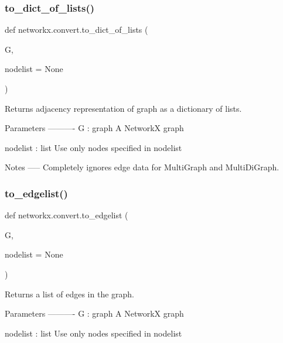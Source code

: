  \mbox{\label{namespacenetworkx_1_1convert_ac0bae8a707df0fe064309f8d481b695f}} 
\subsubsection{\texorpdfstring{to\+\_\+dict\+\_\+of\+\_\+lists()}{to\_dict\_of\_lists()}}
{\footnotesize\ttfamily def networkx.\+convert.\+to\+\_\+dict\+\_\+of\+\_\+lists (\begin{DoxyParamCaption}\item[{}]{G,  }\item[{}]{nodelist = {\ttfamily None} }\end{DoxyParamCaption})}

\begin{DoxyVerb}Returns adjacency representation of graph as a dictionary of lists.

Parameters
----------
G : graph
   A NetworkX graph

nodelist : list
   Use only nodes specified in nodelist

Notes
-----
Completely ignores edge data for MultiGraph and MultiDiGraph.\end{DoxyVerb}
 \mbox{\label{namespacenetworkx_1_1convert_ae68ff44e5c1e4c03bd615d59c482ce17}} 
\subsubsection{\texorpdfstring{to\+\_\+edgelist()}{to\_edgelist()}}
{\footnotesize\ttfamily def networkx.\+convert.\+to\+\_\+edgelist (\begin{DoxyParamCaption}\item[{}]{G,  }\item[{}]{nodelist = {\ttfamily None} }\end{DoxyParamCaption})}

\begin{DoxyVerb}Returns a list of edges in the graph.

Parameters
----------
G : graph
   A NetworkX graph

nodelist : list
   Use only nodes specified in nodelist\end{DoxyVerb}
 \mbox{\label{namespacenetworkx_1_1convert_a7849c4fa2154667a89fff76a6109e3cd}} 
